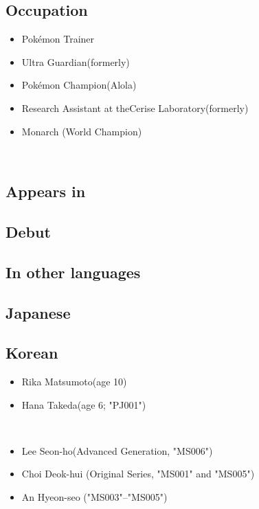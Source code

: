 \documentclass[a4paper,12pt]{article}
\begin{document}
\subsection*{Occupation}\n\n\begin{itemize}
\item Pokémon Trainer
\item Ultra Guardian(formerly)
\item Pokémon Champion(Alola)
\item Research Assistant at theCerise Laboratory(formerly)
\item Monarch (World Champion)
\end{itemize}\\ \par \vspace{0.5cm}

\subsection*{Appears in}\n\n\subsection*{Debut}\n\n\subsection*{In other languages}\n\n\subsection*{Japanese}\n\n\subsection*{Korean}\n\n\begin{itemize}
\item Rika Matsumoto(age 10)
\item Hana Takeda(age 6; "PJ001")
\end{itemize}\\ \par \vspace{0.5cm}

\begin{itemize}
\item Lee Seon-ho(Advanced Generation, "MS006")
\item Choi Deok-hui (Original Series, "MS001" and "MS005")
\item An Hyeon-seo ("MS003"–"MS005")
\end{itemize}\\ \par \vspace{0.5cm}
\end{document}
